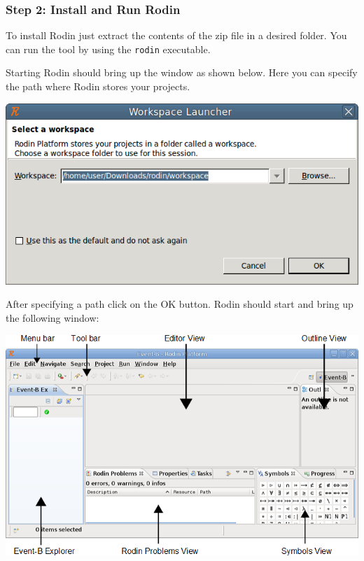 
\subsubsection{Step 2: Install and Run Rodin}

To install Rodin just extract the contents of the zip file in a desired folder. You can run the tool by using the \texttt{rodin} executable.

Starting Rodin should bring up the window as shown below. Here you can specify the path where Rodin stores your projects.

\begin{center}
	\includegraphics{img/tutorial/tut_02_install1.png}
\end{center}

After specifying a path click on the \textsf{OK} button. Rodin should start and bring up the following window:

\begin{center}
	\includegraphics{img/tutorial/tut_02_install2.png}
\end{center}

